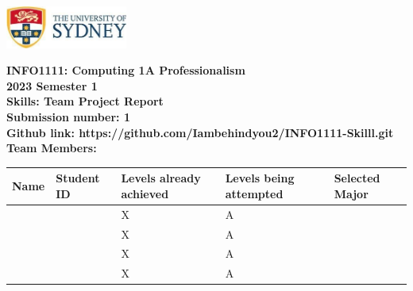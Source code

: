 \documentclass[a4paper, 11pt]{report}
\begin{document}
\begin{titlepage}
\begin{flushright}
\includegraphics[width=4cm]{USyd}\\[2cm]
\end{flushright}
\center 
\textbf{\huge INFO1111: Computing 1A Professionalism}\\[0.75cm]
\textbf{\huge 2023 Semester 1}\\[2cm]
\textbf{\huge Skills: Team Project Report}\\[3cm]

\textbf{\huge Submission number: 1}\\[0.75cm]
\textbf{Github link: https://github.com/Iambehindyou2/INFO1111-Skilll.git}\\[0.75cm]
\textbf{\huge Team Members:}\\[0.75cm]

\begin{tabular}{|p{}|p{}|p{}|p{}|p{}|}
	\hline
	Name & Student ID & \raggedright{Levels already achieved} & \raggedright{Levels being attempted} & Selected Major \\
	\hline
	\hline
	\raggedright{\studA} & \sidA & X & A& \majA \\
	\raggedright{\studB} & \sidB & X & A& \majB \\
	\raggedright{\studC} & \sidC & X & A & \majC \\
	\raggedright{\studD} & \sidD & X & A & \majD \\
	\hline
\end{tabular}
\thispagestyle{empty}
\end{titlepage}


\newpage
\end{document}
